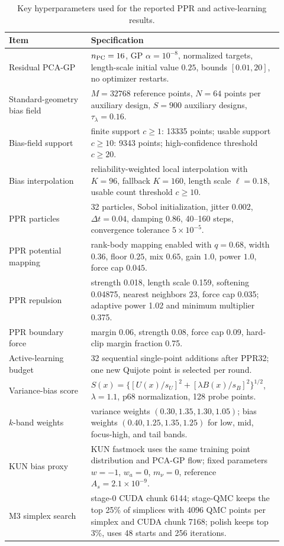 \begin{table}[t]
\centering
\small
\caption{Key hyperparameters used for the reported PPR and active-learning results.}
\label{tab:hyperparameters}
\begin{tabular}{p{0.29\linewidth}p{0.63\linewidth}}
\toprule
Item & Specification \\
\midrule
Residual PCA-GP & \(n_{\rm PC}=16\), GP \(\alpha=10^{-8}\), normalized targets, length-scale initial value \(0.25\), bounds \([0.01,20]\), no optimizer restarts. \\
Standard-geometry bias field & \(M=32768\) reference points, \(N=64\) points per auxiliary design, \(S=900\) auxiliary designs, \(\tau_\lambda=0.16\). \\
Bias-field support & finite support \(c\geq1\): 13335 points; usable support \(c\geq10\): 9343 points; high-confidence threshold \(c\geq20\). \\
Bias interpolation & reliability-weighted local interpolation with \(K=96\), fallback \(K=160\), length scale \(\ell=0.18\), usable count threshold \(c\geq10\). \\
PPR particles & 32 particles, Sobol initialization, jitter 0.002, \(\Delta t=0.04\), damping 0.86, 40--160 steps, convergence tolerance \(5\times10^{-5}\). \\
PPR potential mapping & rank-body mapping enabled with \(q=0.68\), width \(0.36\), floor \(0.25\), mix \(0.65\), gain \(1.0\), power \(1.0\), force cap \(0.045\). \\
PPR repulsion & strength 0.018, length scale 0.159, softening 0.04875, nearest neighbors 23, force cap 0.035; adaptive power 1.02 and minimum multiplier 0.375. \\
PPR boundary force & margin 0.06, strength 0.08, force cap 0.09, hard-clip margin fraction 0.75. \\
Active-learning budget & 32 sequential single-point additions after PPR32; one new Quijote point is selected per round. \\
Variance-bias score & \(S(x)=\{[U(x)/s_U]^2+[\lambda B(x)/s_B]^2\}^{1/2}\), \(\lambda=1.1\), p68 normalization, 128 probe points. \\
\(k\)-band weights & variance weights \((0.30,1.35,1.30,1.05)\); bias weights \((0.40,1.25,1.35,1.25)\) for low, mid, focus-high, and tail bands. \\
KUN bias proxy & KUN fastmock uses the same training point distribution and PCA-GP flow; fixed parameters \(w=-1\), \(w_a=0\), \(m_\nu=0\), reference \(A_s=2.1\times10^{-9}\). \\
M3 simplex search & stage-0 CUDA chunk 6144; stage-QMC keeps the top 25\% of simplices with 4096 QMC points per simplex and CUDA chunk 7168; polish keeps top 3\%, uses 48 starts and 256 iterations. \\
\bottomrule
\end{tabular}
\end{table}
